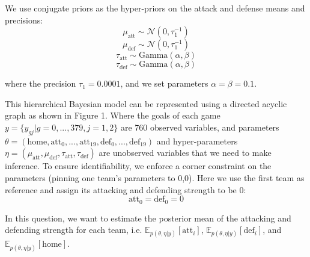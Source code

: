 \documentclass{article}
\begin{document}
We use conjugate priors as the hyper-priors on the attack and defense means and precisions:
$$\mu_{\text{att}} \sim \mathcal{N}(0, \tau_1^{-1})$$
$$\mu_{\text{def}} \sim \mathcal{N}(0, \tau_1^{-1})$$
$$\tau_{\text{att}} \sim \text{Gamma}(\alpha, \beta)$$
$$\tau_{\text{def}} \sim \text{Gamma}(\alpha, \beta)$$

where the precision $\tau_1 = 0.0001$, and we set parameters $\alpha = \beta = 0.1$.

This hierarchical Bayesian model can be represented using a directed acyclic graph as shown in Figure 1.
Where the goals of each game $y = \{y_{gj}|g = 0, ..., 379, j = 1, 2\}$ are 760 observed variables, and parameters
$\theta = (\text{home}, \text{att}_0, ..., \text{att}_{19}, \text{def}_0, ..., \text{def}_{19})$ and hyper-parameters $\eta = (\mu_{\text{att}}, \mu_{\text{def}}, \tau_{\text{att}}, \tau_{\text{def}})$ are unobserved
variables that we need to make inference. To ensure identifiability, we enforce a corner constraint on the
parameters (pinning one team's parameters to 0,0). Here we use the first team as reference and assign its
attacking and defending strength to be 0:
$$\text{att}_0 = \text{def}_0 = 0$$

In this question, we want to estimate the posterior mean of the attacking and defending strength for each
team, i.e. $\mathbb{E}_{p(\theta,\eta|y)}[\text{att}_i]$, $\mathbb{E}_{p(\theta,\eta|y)}[\text{def}_i]$, and $\mathbb{E}_{p(\theta,\eta|y)}[\text{home}]$.
\end{document}
